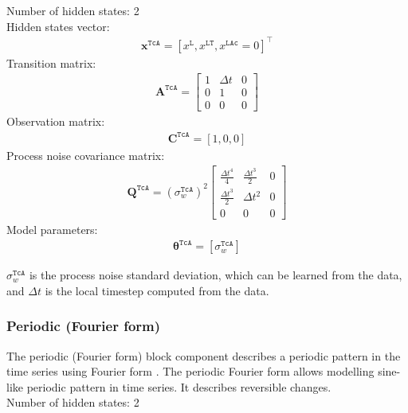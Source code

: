 \noindent
Number of hidden states: 2\\
Hidden states vector: 
\begin{gather*}
 \mathbf{x}^{\mathtt{TcA}} = [x^{\mathtt{L}}, x^{\mathtt{LT}} , x^{\mathtt{LAc}}=0]^{\intercal}
 \end{gather*}
Transition matrix: 
\begin{gather*}
\mathbf{A}^{\mathtt{TcA}}= \left[\begin{array}{ccc}1&\Delta t&0\\0&1&0\\0&0&0\end{array}\right]
\end{gather*}
Observation matrix: 
\begin{gather*}
\mathbf{C}^{\mathtt{TcA}}=[1, 0, 0]
\end{gather*}
Process noise covariance matrix: 
\begin{gather*}
\mathbf{Q}^{\mathtt{TcA}}=(\sigma_{w}^{\mathtt{TcA}})^{2}  \left[\begin{array}{ccc}\tfrac{\Delta t^{4}}{4} &\tfrac{\Delta t^{3}}{2}&0\\\tfrac{\Delta t^{3}}{2}&\Delta t^{2}&0\\0&0&0\end{array}\right] 
\end{gather*}
Model parameters: 
\begin{gather*}
\bm\theta^{\mathtt{TcA}}=[\sigma_{w}^{\mathtt{TcA}} ]
\end{gather*}

\noindent
$\sigma_{w}^{\mathtt{TcA}}$ is the process noise standard deviation, which can be learned from the data, and $\Delta t$ is the local timestep computed from the data.



\subsubsection{Periodic (Fourier form)}

The periodic (Fourier form) block component describes a periodic pattern in the time series using Fourier form \cite{west1999bayesian,STC:STC2035}. 
The periodic Fourier form allows modelling sine-like periodic pattern in time series.
It describes reversible changes.\\

\noindent
Number of hidden states: 2\\


